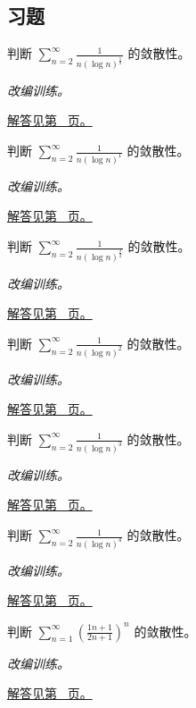 \documentclass[UTF8,12pt,a4paper,fontset=fandol]{ctexart}
\begin{document}
\subsection{习题}
\begin{example}[调和级数的对数修正]\label{ex:c25q1}
判断 $\displaystyle\sum_{n=2}^\infty\frac1{n(\log n)^{\frac{1}{2}}}$ 的敛散性。
\par\textit{改编训练。}\par\hyperref[ans:c25q1]{解答见第~\pageref{ans:c25q1} 页。}
\end{example}
\begin{example}[调和级数的对数修正]\label{ex:c25q2}
判断 $\displaystyle\sum_{n=2}^\infty\frac1{n(\log n)^{1}}$ 的敛散性。
\par\textit{改编训练。}\par\hyperref[ans:c25q2]{解答见第~\pageref{ans:c25q2} 页。}
\end{example}
\begin{example}[调和级数的对数修正]\label{ex:c25q3}
判断 $\displaystyle\sum_{n=2}^\infty\frac1{n(\log n)^{\frac{3}{2}}}$ 的敛散性。
\par\textit{改编训练。}\par\hyperref[ans:c25q3]{解答见第~\pageref{ans:c25q3} 页。}
\end{example}
\begin{example}[调和级数的对数修正]\label{ex:c25q4}
判断 $\displaystyle\sum_{n=2}^\infty\frac1{n(\log n)^{2}}$ 的敛散性。
\par\textit{改编训练。}\par\hyperref[ans:c25q4]{解答见第~\pageref{ans:c25q4} 页。}
\end{example}
\begin{example}[调和级数的对数修正]\label{ex:c25q5}
判断 $\displaystyle\sum_{n=2}^\infty\frac1{n(\log n)^{3}}$ 的敛散性。
\par\textit{改编训练。}\par\hyperref[ans:c25q5]{解答见第~\pageref{ans:c25q5} 页。}
\end{example}
\begin{example}[调和级数的对数修正]\label{ex:c25q6}
判断 $\displaystyle\sum_{n=2}^\infty\frac1{n(\log n)^{4}}$ 的敛散性。
\par\textit{改编训练。}\par\hyperref[ans:c25q6]{解答见第~\pageref{ans:c25q6} 页。}
\end{example}
\begin{example}[根值判别的直接使用]\label{ex:c25q7}
判断 $\displaystyle\sum_{n=1}^\infty\left(\frac{1n+1}{2n+1}\right)^n$ 的敛散性。
\par\textit{改编训练。}\par\hyperref[ans:c25q7]{解答见第~\pageref{ans:c25q7} 页。}
\end{example}
\end{document}

